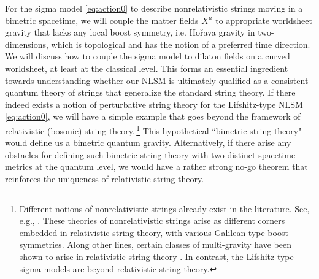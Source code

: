 \documentclass[11pt]{article}
\begin{document}
For the sigma model \eqref{eq:action0} to describe nonrelativistic strings moving in a bimetric spacetime, we will couple the matter fields $X^\mu$ to appropriate worldsheet gravity that lacks any local boost symmetry, i.e. Ho\v{r}ava gravity in two-dimensions, which is topological and has the notion of a preferred time direction. We will discuss how to couple the sigma model to dilaton fields on a curved worldsheet, at least at the classical level. This forms an essential ingredient towards understanding whether our NLSM is ultimately qualified as a consistent quantum theory of strings that generalize the standard string theory. If there indeed exists a notion of perturbative string theory for the Lifshitz-type NLSM \eqref{eq:action0}, we will have a simple example that goes beyond the framework of relativistic (bosonic) string theory.\,\footnote{Different notions of nonrelativistic strings already exist in the literature. See, e.g., \cite{Gomis:2000bd, Danielsson:2000gi, Batlle:2016iel, Gomis:2016zur, Harmark:2017rpg, Harmark:2018cdl, Bergshoeff:2019pij}. These theories of nonrelativistic strings arise as different corners embedded in relativistic string theory, with various Galilean-type boost symmetries. Along other lines, certain classes of multi-gravity have been shown to arise in relativistic string theory \cite{Kiritsis:2008at}. In contrast, the Lifshitz-type sigma models are beyond relativistic string theory.}  This hypothetical ``bimetric string theory" would define us a bimetric quantum gravity. Alternatively, if there arise any obstacles for defining such bimetric string theory with two distinct spacetime metrics at the quantum level, we would have a rather strong no-go theorem that reinforces the uniqueness of relativistic string theory. 
\end{document}
